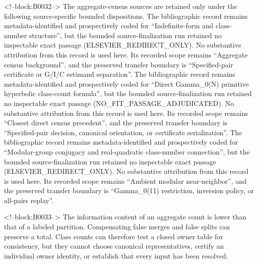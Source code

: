 \documentclass[11pt]{article}
\begin{document}
<!--block:B0032-->
The aggregate-census sources are retained only under the following source-specific bounded dispositions.
The bibliographic record \citep{P31-S14} remains metadata-identified and
prospectively coded for ``Indefinite-form and class-number structure'', but the bounded source-finalization
run retained no inspectable exact passage (ELSEVIER\_REDIRECT\_ONLY).  No substantive
attribution from this record is used here.  Its recorded scope remains
``Aggregate census background'', and the preserved transfer boundary is ``Specified-pair certificate or G/I/C estimand separation''.
The bibliographic record \citep{P31-S21} remains metadata-identified and
prospectively coded for ``Direct Gamma\_0(N) primitive hyperbolic class-count formula'', but the bounded source-finalization
run retained no inspectable exact passage (NO\_FIT\_PASSAGE\_ADJUDICATED).  No substantive
attribution from this record is used here.  Its recorded scope remains
``Closest direct census precedent'', and the preserved transfer boundary is ``Specified-pair decision, canonical orientation, or certificate serialization''.
The bibliographic record \citep{P31-S22} remains metadata-identified and
prospectively coded for ``Modular-group conjugacy and real-quadratic class-number connection'', but the bounded source-finalization
run retained no inspectable exact passage (ELSEVIER\_REDIRECT\_ONLY).  No substantive
attribution from this record is used here.  Its recorded scope remains
``Ambient modular near-neighbor'', and the preserved transfer boundary is ``Gamma\_0(11) restriction, inversion policy, or all-pairs replay''.

<!--block:B0033-->
The information content of an aggregate count is lower than that of a
labeled partition. Compensating false merges and false splits can
preserve a total. Class counts can therefore test a closed owner table
for consistency, but they cannot choose canonical representatives,
certify an individual owner identity, or establish that every input has
been resolved.
\end{document}
